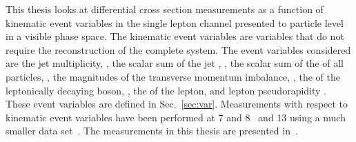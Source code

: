 This thesis looks at differential cross section measurements as a function of kinematic event variables in the single lepton channel presented to particle level in a visible phase space.
The kinematic event variables are variables that do not require the reconstruction of the complete \ttbar{} system.
The event variables considered are the jet multiplicity, \NJET{}, the scalar sum of the jet \pt{}, \HT{}, the scalar sum of the \pt{} of all particles, \ST{}, the magnitudes of the transverse momentum imbalance, \ptmiss{}, the \pt{} of the leptonically decaying \Wboson{} boson, \WPT{}, the \pt{} of the lepton, \LPT{} and lepton pseudorapidity \LETA{}.
These event variables are defined in Sec.~\ref{sec:var}.
Measurements with respect to kinematic event variables have been performed at 7 and 8\TeV{}~\cite{TOP12042} and 13\TeV{} using a much smaller data set~\cite{TOP15013}. The measurements in this thesis are presented in~\cite{TOP16014}.





